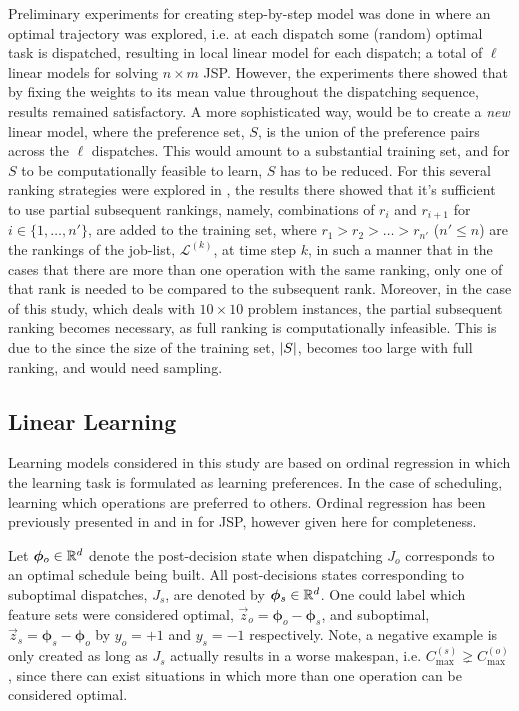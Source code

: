 \documentclass[smallextended]{svjour3}
\renewcommand{\vphi}{\bm \phi}
\begin{document}
Preliminary experiments for creating step-by-step model was done in 
\cite{InRu11a} where an optimal trajectory was explored, i.e. at each dispatch 
some (random) optimal task is dispatched, resulting in local linear model for 
each dispatch; a total of $\ell$ linear models for solving $n\times m$ JSP. 
However, the experiments there showed that by fixing the weights to its mean 
value throughout the dispatching sequence, results remained satisfactory.
A more sophisticated way, would be to create a \emph{new} linear model, where 
the preference set, $S$, is the union of the preference pairs across the $\ell$ 
dispatches. This would amount to a substantial training set, and for $S$ to be 
computationally feasible to learn, $S$ has to be reduced. For this several 
ranking strategies were explored in \cite{InRu14b}, the results there showed 
that it's sufficient to use partial subsequent rankings, namely, combinations 
of $r_i$ and $r_{i+1}$ for $i\in\{1,\ldots,n'\}$, are added to the training 
set, where $r_1>r_2>\ldots>r_{n'}$ ($n'\leq n$) are the rankings of the 
job-list, $\mathcal{L}^{(k)}$, at time step $k$, in such a manner that in the 
cases that there are more than one operation with the same ranking, only one of 
that rank is needed to be compared to the subsequent rank. Moreover, in the 
case of this study, which deals with $10\times 10$ problem instances, the 
partial subsequent ranking becomes necessary, as full ranking is 
computationally infeasible. This is due to the since the size of the training 
set, $\lvert S\rvert$, becomes too large with full ranking, and would need sampling.

\subsection{Linear Learning}

Learning models considered in this study are based on ordinal regression in 
which the learning task is formulated as learning preferences. In the case of 
scheduling, learning which operations are preferred to others. Ordinal 
regression has been previously presented in \cite{Ru06:PPSN} and in 
\cite{InRu11a} for JSP, however given here for completeness. 

Let $\vphi_{o}\in\R^d$ denote the post-decision state when dispatching $J_o$ 
corresponds to an optimal schedule being built. All post-decisions states 
corresponding to suboptimal dispatches, $J_s$, are denoted by 
$\vphi_{s}\in\R^d$. One could label which feature sets were considered optimal, 
$\vec{z}_{o}=\vphi_{o}-\vphi_{s}$, and suboptimal, 
$\vec{z}_{s}=\vphi_{s}-\vphi_{o}$ by $y_o=+1$ and $y_s=-1$ respectively. 
Note, a negative example is only created as long as $J_s$ actually results in a 
worse makespan, i.e. $C_{\max}^{(s)}\gneq C_{\max}^{(o)}$, since there can 
exist situations in which more than one operation can be considered optimal.
\end{document}
